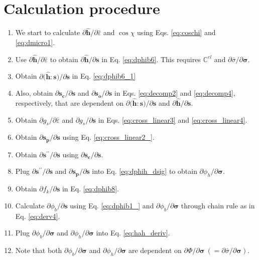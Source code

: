 \documentclass[12pt]{amsart}
\begin{document}
\section{Calculation procedure}
\label{sec:prc}
  \begin{enumerate}[1)]
    \item We start to calculate $\partial \hat{\mathbf{h}}/\partial \bar{\varepsilon}$ and $\cos\chi$ using Eqs. \ref{eq:coschi} and \ref{eq:dmicro1}.
\item Use $\partial \hat{\mathbf{h}}/\partial \bar{\varepsilon}$ to obtain $\partial \hat{\mathbf{h}}/\partial \mathbf{s}$ in Eq. \ref{eq:dphib6}. This requires $\mathbb{C}^{el}$ and $\partial\bar{\sigma}/\partial\mathbf{\sigma}$.
\item Obtain $\partial\big(\hat{\mathbf{h}}:\mathbf{s}\big)/\partial \mathbf{s}$ in Eq. \ref{eq:dphib6_1}
\item Also, obtain $\partial \mathbf{s_c}/\partial \mathbf{s}$ and $\partial \mathbf{s_o}/\partial\mathbf{s}$ in Eqs. \ref{eq:decomp2} and \ref{eq:decomp4}, respectively, that are dependent on $\partial \big(\hat{\mathbf{h}}:\mathbf{s}\big)/\partial\mathbf{s}$ and $\partial \hat{\mathbf{h}}/\partial\mathbf{s}$.
\item Obtain $\partial g_s/\partial\bar{\varepsilon}$ and $\partial g_s/\partial\mathbf{s}$ in Eqs. \ref{eq:cross_linear3} and \ref{eq:cross_linear4}.
\item Obtain $\partial \mathbf{s_p}/\partial\mathbf{s}$ using Eq. \ref{eq:cross_linear2_}.
\item Obtain $\partial\mathbf{s}^{\prime\prime}/\partial\mathbf{s}$ using $\partial \mathbf{s_c}/\partial \mathbf{s}$.
\item Plug $\partial\mathbf{s}^{\prime\prime}/\partial\mathbf{s}$ and  $\partial \mathbf{s_p}/\partial\mathbf{s}$ into Eq. \ref{eq:dphih_dsig} to obtain $\partial\phi_h/\partial\mathbf{\sigma}$.
\item Obtain $\partial f_k/\partial \mathbf{s}$ in Eq. \ref{eq:dphib8}.
\item Calculate $\partial \phi_b/\partial \mathbf{s}$ using Eq. \ref{eq:dphib1_} and $\partial \phi_b/\partial \mathbf{\sigma}$ through chain rule as in Eq. \ref{eq:derv4}.
\item Plug $\partial \phi_b/\partial\mathbf{\sigma}$ and $\partial\phi_h/\partial\mathbf{\sigma}$ into Eq. \ref{eq:hah_deriv}.
\item Note that both $\partial \phi_b/\partial\mathbf{\sigma}$ and $\partial\phi_h/\partial\mathbf{\sigma}$ are dependent on $\partial\Phi/\partial\mathbf{\sigma}\ (=\partial\bar{\sigma}/\partial\mathbf{\sigma})$.
  \end{enumerate}





\newpage


\end{document}
